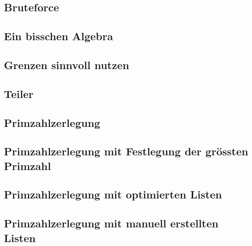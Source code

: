 \documentclass[a4paper, 10pt, fleqn]{article}
\begin{document}
\begin{appendices}
  \subsection{Bruteforce}
  \label{res:1}
  
  \subsection{Ein bisschen Algebra}
  \label{res:2}
  
  \subsection{Grenzen sinnvoll nutzen}
  \label{res:3}
  
  \subsection{Teiler}
  \label{res:4}
  
  \subsection{Primzahlzerlegung}
  \label{res:5}
  
  \subsection{Primzahlzerlegung mit Festlegung der grössten Primzahl}
  \label{res:6}
  
  \subsection{Primzahlzerlegung mit optimierten Listen}
  \label{res:7}
  
  \subsection{Primzahlzerlegung mit manuell erstellten Listen}
  \label{res:8}
    

\end{appendices}
\end{document}
